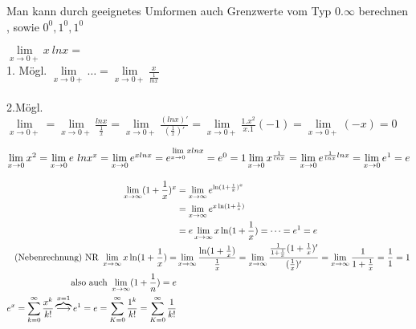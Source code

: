\begin{remark}
Man kann durch geeignetes Umformen auch Grenzwerte vom Typ $0.\infty $ berechnen , sowie $0^0 , 1^0 , 1^0$
\end{remark}
 \begin{example}
$\lim\limits_{x \rightarrow 0+} x \ lnx=$\\
1. Mögl. $\lim\limits_{x \rightarrow 0+} \dots = \lim\limits_{x \rightarrow 0+}\frac{x}{\frac{1}{lnx}}$  \\ \\
2.Mögl. $\lim\limits_{x \rightarrow 0+}=\lim\limits_{x \rightarrow 0+}\frac{lnx}{\frac{1}{x}}=\lim\limits_{x \rightarrow 0+}\frac{(lnx)'}{(\frac{1}{x})'}= \lim\limits_{x \rightarrow 0+} \frac{1.x^2}{x.1}(-1)=\lim\limits_{x \rightarrow 0+}(-x)=0$
 \end{example}
\begin{example}
$\lim\limits_{x \rightarrow 0}x^2=\lim\limits_{x \rightarrow 0}e \ lnx^x= \lim\limits_{x \rightarrow 0}e^{xlnx}=e^{\lim\limits_{x \rightarrow 0} xlnx}=e^0=1 \\ \\
\lim\limits_{x \rightarrow 0}x^{\frac{1}{lnx}}= \lim\limits_{x \rightarrow 0} e^{\frac{1}{lnx}lnx}= \lim\limits_{x \rightarrow 0} e^1=e$
\end{example}
\begin{example}
	\begin{align*} 
	\lim\limits_{x \to \infty} (1+\frac{1}{x})^x &=\lim\limits_{x \to \infty} e^{\ln(1+\frac{1}{x})^x} \\	&=\lim\limits_{x \to \infty} e^{x \ln (1+\frac{1}{x})}\\
	&=e \lim\limits_{x \to \infty} x \ln (1+\frac{1}{x})= \dots = e^1=e \\	
	\text{(Nebenrechnung) NR }\lim\limits_{x \to \infty} x \ln (1+\frac{1}{x})=& \lim\limits_{x \to \infty}\frac{\ln (1+\frac{1}{x})}{\frac{1}{x}} = \lim\limits_{x \to \infty} \frac{\frac{1}{1+\frac{1}{x}}(1+\frac{1}{x})'}{(\frac{1}{x})'}= \lim\limits_{x \to \infty} \frac{1}{1+\frac{1}{x}}=\frac{1}{1}=1\\
	\text{also auch } \lim\limits_{x \to \infty} (1+\frac{1}{n})=e \\
	e^x = \sum_{k=0}^{\infty} \frac{x^k}{k!} \overbrace{\longrightarrow}^{x=1} e^1 =e= \sum_{K=0}^{\infty} \frac{1^k}{k!}= \sum_{K=0}^{\infty} \frac{1}{k!}
	\end{align*}
\end{example}
